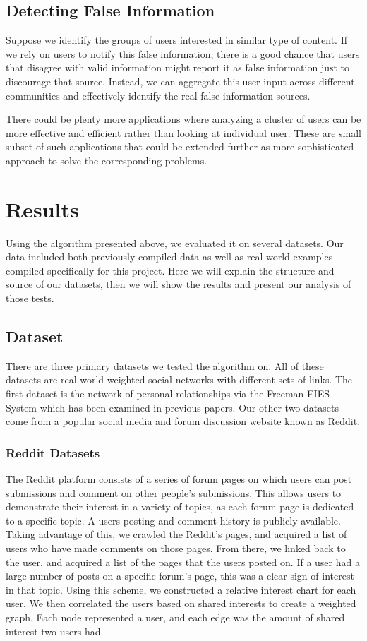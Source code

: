 \documentclass{article}
\begin{document}
\subsection{Detecting False Information}
Suppose we identify the groups of users interested in similar type of content. If we rely on users to notify this false
information, there is a good chance that users that disagree with valid information might report it as false information
just to discourage that source. Instead, we can aggregate this user input across different communities and effectively
identify the real false information sources. 

There could be plenty more applications where analyzing a cluster of users can be more effective and efficient rather
than looking at individual user. These are small subset of such applications that could be extended further as more
sophisticated approach to solve the corresponding problems.  
\section{Results}
Using the algorithm presented above, we evaluated it on several datasets. Our data included both previously compiled data as well as real-world examples compiled specifically for this project. Here we will explain the structure and source of our datasets, then we will show the results and present our analysis of those tests.

\subsection{Dataset}
There are three primary datasets we tested the algorithm on. All of these datasets are real-world weighted social networks with different sets of links. The first dataset is the network of personal relationships via the Freeman EIES System which has been examined in previous papers. Our other two datasets come from a popular social media and forum discussion website known as Reddit. 

\subsubsection{Reddit Datasets}
The Reddit platform consists of a series of forum pages on which users can post submissions and comment on other people's submissions. This allows users to demonstrate their interest in a variety of topics, as each forum page is dedicated to a specific topic. A users posting and comment history is publicly available. Taking advantage of this, we crawled the Reddit's pages, and acquired a list of users who have made comments on those pages. From there, we linked back to the user, and acquired a list of the pages that the users posted on. If a user had a large number of posts on a specific forum's page, this was a clear sign of interest in that topic. Using this scheme, we constructed a relative interest chart for each user. We then correlated the users based on shared interests to create a weighted graph. Each node represented a user, and each edge was the amount of shared interest two users had. 
\end{document}
